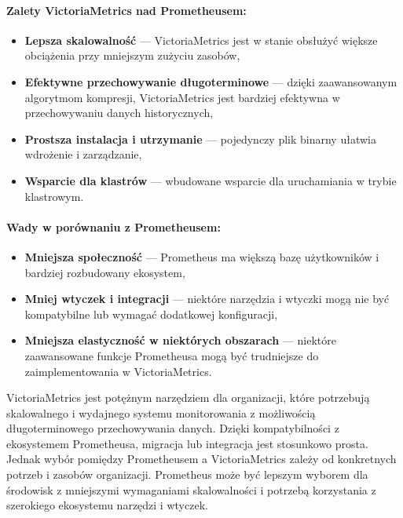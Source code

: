 \documentclass{article}
\begin{document}
\paragraph{Zalety VictoriaMetrics nad Prometheusem:}

\begin{itemize}
    \item \textbf{Lepsza skalowalność} — VictoriaMetrics jest w stanie obsłużyć większe obciążenia przy mniejszym zużyciu zasobów,
    \item \textbf{Efektywne przechowywanie długoterminowe} — dzięki zaawansowanym algorytmom kompresji, VictoriaMetrics jest bardziej efektywna w przechowywaniu danych historycznych,
    \item \textbf{Prostsza instalacja i utrzymanie} — pojedynczy plik binarny ułatwia wdrożenie i zarządzanie,
    \item \textbf{Wsparcie dla klastrów} — wbudowane wsparcie dla uruchamiania w trybie klastrowym.
\end{itemize}

\paragraph{Wady w porównaniu z Prometheusem:}

\begin{itemize}
    \item \textbf{Mniejsza społeczność} — Prometheus ma większą bazę użytkowników i bardziej rozbudowany ekosystem,
    \item \textbf{Mniej wtyczek i integracji} — niektóre narzędzia i wtyczki mogą nie być kompatybilne lub wymagać dodatkowej konfiguracji,
    \item \textbf{Mniejsza elastyczność w niektórych obszarach} — niektóre zaawansowane funkcje Prometheusa mogą być trudniejsze do zaimplementowania w VictoriaMetrics.
\end{itemize}


VictoriaMetrics jest potężnym narzędziem dla organizacji, które potrzebują skalowalnego i wydajnego systemu monitorowania z możliwością długoterminowego przechowywania danych. Dzięki kompatybilności z ekosystemem Prometheusa, migracja lub integracja jest stosunkowo prosta. Jednak wybór pomiędzy Prometheusem a VictoriaMetrics zależy od konkretnych potrzeb i zasobów organizacji. Prometheus może być lepszym wyborem dla środowisk z mniejszymi wymaganiami skalowalności i potrzebą korzystania z szerokiego ekosystemu narzędzi i wtyczek.
\end{document}
